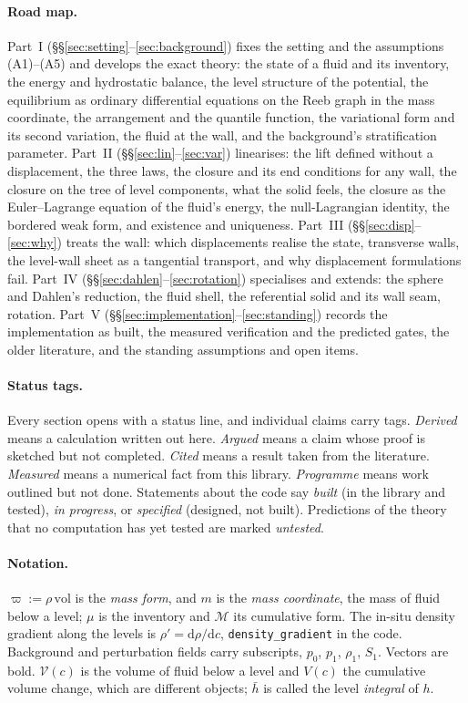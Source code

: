 \documentclass[11pt]{article}
\theoremstyle{definition}
\theoremstyle{remark}
\newcommand{\Vol}{\mathcal V}
\newcommand{\Mcdf}{\mathcal M}
\newcommand{\vol}{\mathrm{vol}}
\newcommand{\code}[1]{\texttt{#1}}
\begin{document}
\paragraph{Road map.} Part~I (\S\S\ref{sec:setting}--\ref{sec:background})
fixes the setting and the assumptions (A1)--(A5) and develops the
exact theory: the state of a fluid and its inventory, the energy and
hydrostatic balance, the level structure of the potential, the
equilibrium as ordinary differential equations on the Reeb graph in
the mass coordinate, the arrangement and the quantile function, the
variational form and its second variation, the fluid at the wall, and
the background's stratification parameter. Part~II
(\S\S\ref{sec:lin}--\ref{sec:var}) linearises: the lift defined
without a displacement, the three laws, the closure and its end
conditions for any wall, the closure on the tree of level components,
what the solid feels, the closure as the Euler--Lagrange equation of
the fluid's energy, the null-Lagrangian identity, the bordered weak
form, and existence and uniqueness. Part~III
(\S\S\ref{sec:disp}--\ref{sec:why}) treats the wall: which
displacements realise the state, transverse walls, the level-wall
sheet as a tangential transport, and why displacement formulations
fail. Part~IV (\S\S\ref{sec:dahlen}--\ref{sec:rotation}) specialises
and extends: the sphere and Dahlen's reduction, the fluid shell, the
referential solid and its wall seam, rotation. Part~V
(\S\S\ref{sec:implementation}--\ref{sec:standing}) records the
implementation as built, the measured verification and the predicted
gates, the older literature, and the standing assumptions and open
items.

\paragraph{Status tags.} Every section opens with a status line, and
individual claims carry tags. \emph{Derived} means a calculation
written out here. \emph{Argued} means a claim whose proof is sketched
but not completed. \emph{Cited} means a result taken from the
literature. \emph{Measured} means a numerical fact from this library.
\emph{Programme} means work outlined but not done. Statements about
the code say \emph{built} (in the library and tested), \emph{in
progress}, or \emph{specified} (designed, not built). Predictions of
the theory that no computation has yet tested are marked
\emph{untested}.

\paragraph{Notation.} $\varpi := \rho\,\vol$ is the
\emph{mass form}, and $m$
is the \emph{mass coordinate}, the mass of fluid below a level; $\mu$
is the inventory and $\Mcdf$ its cumulative form. The in-situ density
gradient along the levels is
$\rho' = \mathrm d\rho/\mathrm dc$, \code{density\_gradient} in the
code. Background and
perturbation fields carry subscripts, $p_0$, $p_1$, $\rho_1$, $S_1$.
Vectors are bold. $\Vol(c)$ is
the volume of fluid below a level and $V(c)$ the cumulative volume
change, which are different objects; $\bar h$ is called the level
\emph{integral} of $h$.
\end{document}
